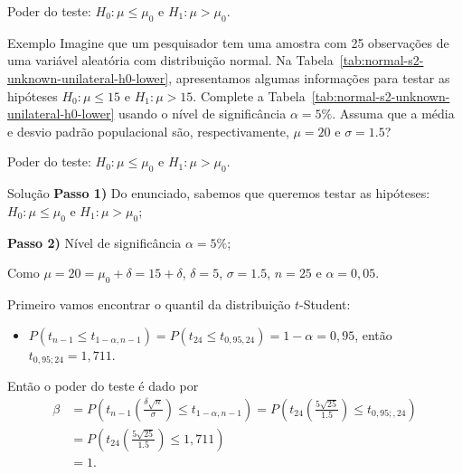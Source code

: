 \documentclass[8pt]{beamer}
\begin{document}
\begin{frame}{Poder do teste: $H_0:\mu \leq \mu_0$ e $H_1: \mu > \mu_0$.}

\large

\begin{block}{Exemplo}
	Imagine que um pesquisador tem uma amostra com 25 observações de uma variável aleatória com distribuição normal. Na Tabela~\ref{tab:normal-s2-unknown-unilateral-h0-lower}, apresentamos algumas informações para testar as hipóteses $H_0: \mu \leq 15$ e $H_1: \mu > 15$. Complete a Tabela~\ref{tab:normal-s2-unknown-unilateral-h0-lower} usando o nível de significância $\alpha=5\%$. Assuma que a média e desvio padrão populacional são, respectivamente, $\mu=20$ e $\sigma=1.5$?
	\begin{table}[ht]
		\centering
		\caption{Algumas informações do experimento.} 
		\label{tab:normal-s2-unknown-unilateral-h0-lower}
	\end{table}
\end{block}

\normalsize

\end{frame}

\begin{frame}{Poder do teste: $H_0:\mu \leq \mu_0$ e $H_1: \mu > \mu_0$.}

\begin{block}{Solução}
	\textbf{Passo 1)} Do enunciado, sabemos que queremos testar as hipóteses: $H_0: \mu \leq \mu_0$ e $H_1: \mu > \mu_0$;

	\textbf{Passo 2)} Nível de significância $\alpha = 5\%$;
	
	Como $\mu=20=\mu_0 + \delta = 15 + \delta$, $\delta = 5$, $\sigma = 1.5$, $n=25$ e $\alpha=0,05$.
	
	Primeiro vamos encontrar o quantil da distribuição $t$-Student:
	\begin{itemize}
		\item $P\left( t_{n-1} \leq  t_{1-\alpha, n-1} \right) = P\left( t_{24} \leq  t_{0,95, 24} \right) = 1-\alpha = 0,95$, então $t_{0,95; 24} = 1,711$.
	\end{itemize}
	
	Então o poder do teste é dado por
	\begin{align*}
	\beta &= P \left( t_{n-1}\left( \frac{\delta\sqrt{n}}{\sigma}\right) \leq t_{1-\alpha, n-1}  \right) = P \left( t_{24}\left( \frac{5\sqrt{25}}{1.5}\right) \leq t_{0,95;, 24} \right) \\ 
	&= P \left( t_{24}\left( \frac{5\sqrt{25}}{1.5}\right) \leq 1,711 \right)\\
	&= 1.
	\end{align*}
\end{block}
\end{frame}
\end{document}

